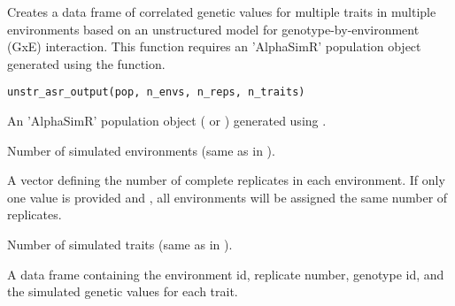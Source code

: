 \documentclass[a4paper]{book}
\begin{document}
%
\begin{Description}\relax
Creates a data frame of correlated genetic values for multiple traits in multiple environments
based on an unstructured model for genotype-by-environment (GxE) interaction. This function
requires an 'AlphaSimR' population object generated using the 
function.
\end{Description}
%
\begin{Usage}
\begin{verbatim}
unstr_asr_output(pop, n_envs, n_reps, n_traits)
\end{verbatim}
\end{Usage}
%
\begin{Arguments}
\begin{ldescription}
\item[\code{pop}] An 'AlphaSimR' population object ( or
) generated using .

\item[\code{n\_envs}] Number of simulated environments (same as in ).

\item[\code{n\_reps}] A vector defining the number of complete replicates in each environment. If only
one value is provided and , all environments will be assigned the same
number of replicates.

\item[\code{n\_traits}] Number of simulated traits (same as in ).
\end{ldescription}
\end{Arguments}
%
\begin{Value}
A data frame containing the environment id, replicate number, genotype id, and the
simulated genetic values for each trait.
\end{Value}
%
\end{document}

